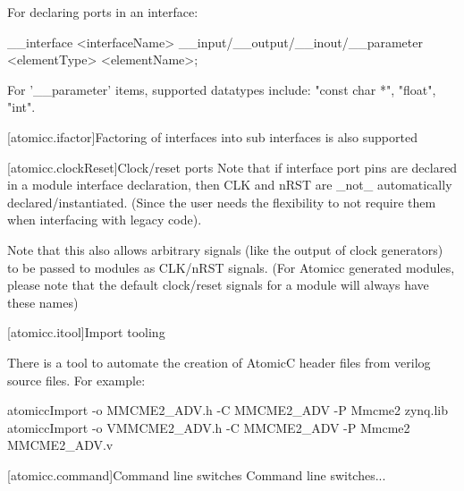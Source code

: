 For declaring ports in an interface:
\begin{codeblock}
     __interface <interfaceName> {
          __input/__output/__inout/__parameter <elementType> <elementName>;
     }
\end{codeblock}
For '__parameter' items, supported datatypes include: "const char *", "float", "int".

[atomicc.ifactor]{Factoring of interfaces into sub interfaces is also supported}

[atomicc.clockReset]{Clock/reset ports}
Note that if interface port pins are declared in a module interface declaration, then
CLK and nRST are _not_ automatically declared/instantiated.  (Since the user needs the
flexibility to not require them when interfacing with legacy code).

Note that this also allows arbitrary signals (like the output of clock generators) to be
passed to modules as CLK/nRST signals.  (For Atomicc generated modules, please note that the
default clock/reset signals for a module will always have these names)

[atomicc.itool]{Import tooling}

There is a tool to automate the creation of AtomicC header files from verilog source files.
For example:
\begin{codeblock}
     atomiccImport -o MMCME2_ADV.h -C MMCME2_ADV -P Mmcme2 zynq.lib
     atomiccImport -o VMMCME2_ADV.h -C MMCME2_ADV -P Mmcme2 MMCME2_ADV.v
\end{codeblock}

[atomicc.command]{Command line switches}
Command line switches...
